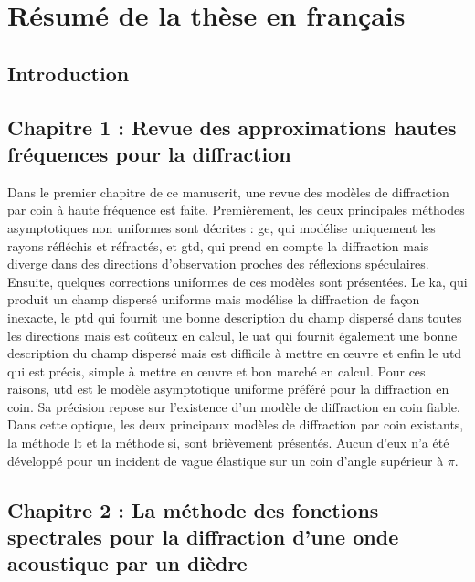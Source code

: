 \chapter[][Résumé de la thèse en français]{Résumé de la thèse en français}
\section*{Introduction}

\section{Chapitre 1 : Revue des approximations hautes fréquences pour la diffraction}

Dans le premier chapitre de ce manuscrit, une revue des modèles de diffraction par coin à haute fréquence est faite. Premièrement, les deux principales méthodes asymptotiques non uniformes sont décrites : \acrfull{ge}, qui modélise uniquement les rayons réfléchis et réfractés, et \acrfull{gtd}, qui prend en compte la diffraction mais diverge dans des directions d'observation proches des réflexions spéculaires. Ensuite, quelques corrections uniformes de ces modèles sont présentées. Le \acrfull{ka}, qui produit un champ dispersé uniforme mais modélise la diffraction de façon inexacte, le \acrfull{ptd} qui fournit une bonne description du champ dispersé dans toutes les directions mais est coûteux en calcul, le \acrfull{uat} qui fournit également une bonne description du champ dispersé mais est difficile à mettre en œuvre et enfin le \acrfull{utd} qui est précis, simple à mettre en œuvre et bon marché en calcul. Pour ces raisons, \acrshort{utd} est le modèle asymptotique uniforme préféré pour la diffraction en coin. Sa précision repose sur l'existence d'un modèle de diffraction en coin fiable. Dans cette optique, les deux principaux modèles de diffraction par coin existants, la méthode \acrfull{lt} et la méthode \acrfull{si}, sont brièvement présentés. Aucun d'eux n'a été développé pour un incident de vague élastique sur un coin d'angle supérieur à $\pi$.

\section{Chapitre 2 : La méthode des fonctions spectrales pour la diffraction d'une onde acoustique par un dièdre}

